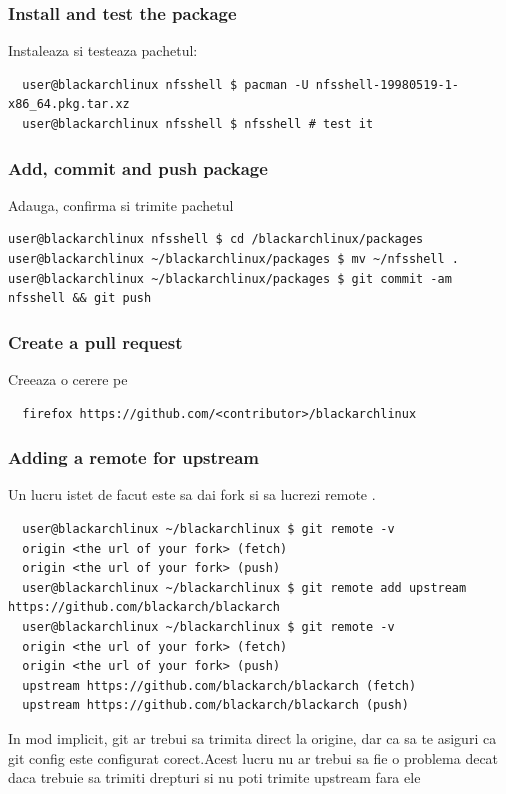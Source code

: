 \documentclass[a4paper, oneside, 11pt]{book}
\def\href#1#2{\htmladdnormallink{#2}{#1}}
\begin{document}
\subsubsection{Install and test the package}
Instaleaza si testeaza pachetul:
\begin{lstlisting}
  user@blackarchlinux nfsshell $ pacman -U nfsshell-19980519-1-x86_64.pkg.tar.xz
  user@blackarchlinux nfsshell $ nfsshell # test it
\end{lstlisting}

\subsubsection{Add, commit and push package}
Adauga, confirma si trimite pachetul
\begin{lstlisting}user@blackarchlinux nfsshell $ cd /blackarchlinux/packages
user@blackarchlinux ~/blackarchlinux/packages $ mv ~/nfsshell .
user@blackarchlinux ~/blackarchlinux/packages $ git commit -am nfsshell && git push
\end{lstlisting}

\subsubsection{Create a pull request}
Creeaza o cerere pe \href{https://github.com/}{github.com}
\begin{lstlisting}
  firefox https://github.com/<contributor>/blackarchlinux
\end{lstlisting}

\subsubsection{Adding a remote for upstream}
Un lucru istet de facut este sa dai fork si sa lucrezi remote .
\begin{lstlisting}
  user@blackarchlinux ~/blackarchlinux $ git remote -v
  origin <the url of your fork> (fetch)
  origin <the url of your fork> (push)
  user@blackarchlinux ~/blackarchlinux $ git remote add upstream https://github.com/blackarch/blackarch
  user@blackarchlinux ~/blackarchlinux $ git remote -v
  origin <the url of your fork> (fetch)
  origin <the url of your fork> (push)
  upstream https://github.com/blackarch/blackarch (fetch)
  upstream https://github.com/blackarch/blackarch (push)
\end{lstlisting}

In mod implicit, git ar trebui sa trimita direct la origine, dar ca sa te asiguri ca git config este configurat corect.Acest lucru nu ar trebui sa fie o problema decat daca trebuie sa trimiti drepturi si nu poti trimite upstream fara ele
\end{document}
